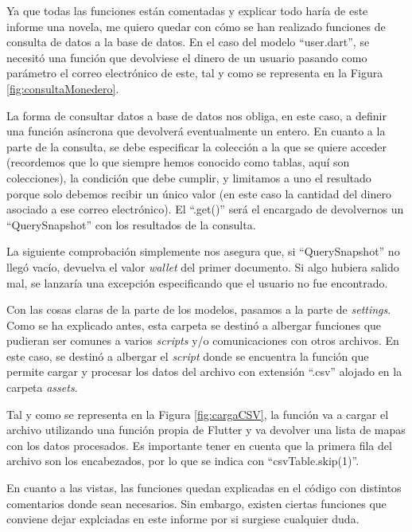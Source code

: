 
	Ya que todas las funciones están comentadas y explicar todo haría de este informe una novela, me quiero quedar con cómo se han realizado funciones de consulta de datos a la base de datos. En el caso del modelo ``user.dart'', se necesitó una función que devolviese el dinero de un usuario pasando como parámetro el correo electrónico de este, tal y como se representa en la Figura \ref{fig:consultaMonedero}.
	

	La forma de consultar datos a base de datos nos obliga, en este caso, a definir una función asíncrona que devolverá eventualmente un entero. En cuanto a la parte de la consulta, se debe especificar la colección a la que se quiere acceder (recordemos que lo que siempre hemos conocido como tablas, aquí son colecciones), la condición que debe cumplir, y limitamos a uno el resultado porque solo debemos recibir un único valor (en este caso la cantidad del dinero asociado a ese correo electrónico). El ``.get()'' será el encargado de devolvernos un ``QuerySnapshot'' con los resultados de la consulta. 
	
	La siguiente comprobación simplemente nos asegura que, si ``QuerySnapshot'' no llegó vacío, devuelva el valor \emph{wallet} del primer documento. Si algo hubiera salido mal, se lanzaría una excepción especificando que el usuario no fue encontrado.
	
	Con las cosas claras de la parte de los modelos, pasamos a la parte de \emph{settings}. Como se ha explicado antes, esta carpeta se destinó a albergar funciones que pudieran ser comunes a varios \emph{scripts} y/o comunicaciones con otros archivos. En este caso, se destinó a albergar el \emph{script} donde se encuentra la función que permite cargar y procesar los datos del archivo con extensión ``.csv'' alojado en la carpeta \emph{assets}.
	
	Tal y como se representa en la Figura \ref{fig:cargaCSV}, la función va a cargar el archivo utilizando una función propia de Flutter y va devolver una lista de mapas con los datos procesados. Es importante tener en cuenta que la primera fila del archivo son los encabezados, por lo que se indica con ``csvTable.skip(1)''. 
	

	En cuanto a las vistas, las funciones quedan explicadas en el código con distintos comentarios donde sean necesarios. Sin embargo, existen ciertas funciones que conviene dejar explciadas en este informe por si surgiese cualquier duda.
	
